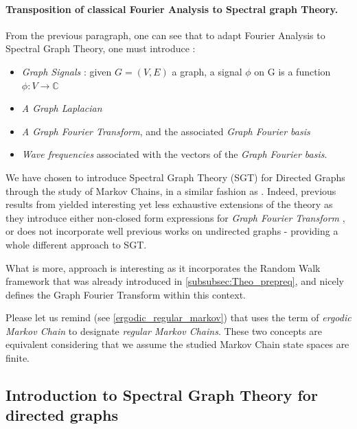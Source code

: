 \documentclass[sn-mathphys]{sn-jnl}%
\theoremstyle{thmstyleone}%
\theoremstyle{thmstyletwo}%
\theoremstyle{thmstylethree}%
\begin{document}
\paragraph{Transposition of classical Fourier Analysis to Spectral graph Theory.} 
From the previous paragraph, one can see that to adapt Fourier
Analysis to Spectral Graph Theory, one must introduce :
\begin{itemize}
\item \textit{Graph Signals} : given $G=(V,E)$ a graph, a signal
  $\phi$ on G is a function $\phi : V \rightarrow \mathbb{C}$
  
\item \textit{A Graph Laplacian}
  
\item \textit{A Graph Fourier Transform}, and the associated \textit{Graph Fourier basis}
  
\item \textit{Wave frequencies} associated with the vectors of the \textit{Graph Fourier basis}.
\end{itemize}

We have chosen to introduce Spectral Graph Theory (SGT) for Directed
Graphs through the study of Markov Chains, in a similar fashion as
\cite{sevi2019}. Indeed, previous results from
\cite{sandryhaila_moura_2014, sardellitti_barbarossa_lorenzo_2017}
yielded interesting yet less exhaustive extensions of the theory as
they introduce either non-closed form expressions for \textit{Graph
  Fourier Transform} \cite{sardellitti_barbarossa_lorenzo_2017}, or
does not incorporate well previous works on undirected graphs
-\cite{sandryhaila_moura_2014} providing a whole different approach to
SGT.

What is more, \cite{sevi2019} approach is interesting as it
incorporates the Random Walk framework that was already introduced in
\ref{subsubsec:Theo_prepreq}, and nicely defines the Graph Fourier
Transform within this context.

Please let us remind (see \ref{ergodic_regular_markov}) that
\cite{sevi2019} uses the term of \textit{ergodic Markov Chain} to
designate \textit{regular Markov Chains}. These two concepts are
equivalent considering that we assume the studied Markov Chain state
spaces are finite.

\subsection{Introduction to Spectral Graph Theory for directed graphs}
\end{document}

